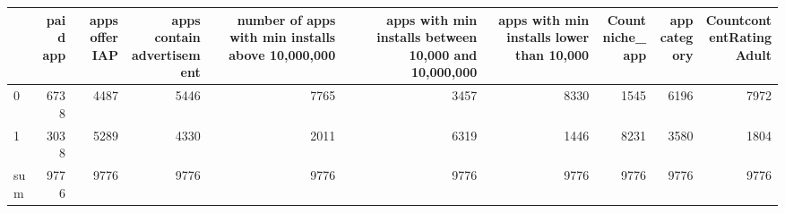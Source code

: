 \begin{tabular}{lrrrrrrrrr}
\toprule
{} &  paid app &  apps offer IAP &  apps contain advertisement &  number of apps with min installs above 10,000,000 &  apps with min installs between 10,000 and 10,000,000 &  apps with min installs lower than 10,000 &  Countniche\_app &  app category &  CountcontentRatingAdult \\
\midrule
0   &  6738 &  4487 &  5446 &  7765 &  3457 &  8330 &  1545 &  6196 &  7972 \\
1   &  3038 &  5289 &  4330 &  2011 &  6319 &  1446 &  8231 &  3580 &  1804 \\
sum &  9776 &  9776 &  9776 &  9776 &  9776 &  9776 &  9776 &  9776 &  9776 \\
\bottomrule
\end{tabular}
